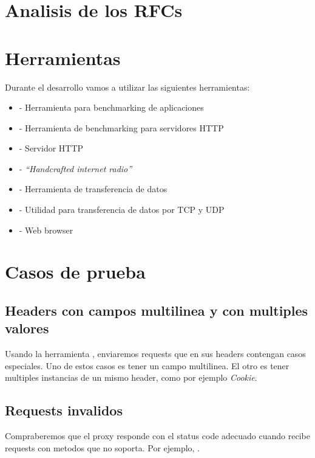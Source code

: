 \documentclass[11pt,a4paper,titlepage]{article}
\begin{document}
\section{Analisis de los RFCs}

\section{Herramientas}
    Durante el desarrollo vamos a utilizar las siguientes herramientas:
    \begin{itemize}
        \item {} - Herramienta para benchmarking de aplicaciones
        \item {} - Herramienta de benchmarking para servidores HTTP
        \item {} - Servidor HTTP
        \item {} - \emph{``Handcrafted internet radio''}
        \item {} - Herramienta de transferencia de datos
        \item {} - Utilidad para transferencia de datos por TCP y UDP
        \item {} - Web browser
    \end{itemize}

\section{Casos de prueba}
\subsection{Headers con campos multilinea y con multiples valores}
Usando la herramienta , enviaremos requests que en sus headers contengan casos especiales.
Uno de estos casos es tener un campo multilinea.
El otro es tener multiples instancias de un mismo header, como por ejemplo \textit{Cookie}.

\subsection{Requests invalidos}
Compraberemos que el proxy responde con el status code adecuado cuando recibe requests con metodos que no soporta.
Por ejemplo, .
\end{document}
